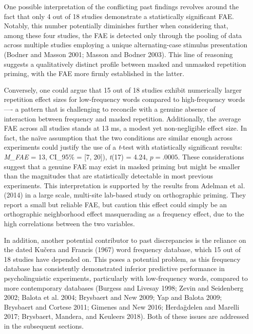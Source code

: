 \documentclass[
]{interact}
\begin{document}
One possible interpretation of the conflicting past findings revolves
around the fact that only 4 out of 18 studies demonstrate a
statistically significant FAE. Notably, this number potentially
diminishes further when considering that, among these four studies, the
FAE is detected only through the pooling of data across multiple studies
employing a unique alternating-case stimulus presentation (Bodner and
Masson 2001; Masson and Bodner 2003). This line of reasoning suggests a
qualitatively distinct profile between masked and unmasked repetition
priming, with the FAE more firmly established in the latter.

Conversely, one could argue that 15 out of 18 studies exhibit
numerically larger repetition effect sizes for low-frequency words
compared to high-frequency words ---- a pattern that is challenging to
reconcile with a genuine absence of interaction between frequency and
masked repetition. Additionally, the average FAE across all studies
stands at 13 ms, a modest yet non-negligible effect size. In fact, the
naïve assumption that the two conditions are similar enough across
experiments could justify the use of a \emph{t}-test with statistically
significant results: \emph{M\_FAE} = 13, CI\_95\% = {[}7, 20{]}),
\emph{t}(17) = 4.24, \(p=.0005\). These considerations suggest that a
genuine FAE may exist in masked priming but might be smaller than the
magnitudes that are statistically detectable in most previous
experiments. This interpretation is supported by the results from
Adelman et al. (2014) in a large scale, multi-site lab-based study on
orthographic priming. They report a small but reliable FAE, but caution
this effect could simply be an orthographic neighborhood effect
masquerading as a frequency effect, due to the high correlations between
the two variables.

In addition, another potential contributor to past discrepancies is the
reliance on the dated Kučera and Francis (1967) word frequency database,
which 15 out of 18 studies have depended on. This poses a potential
problem, as this frequency database has consistently demonstrated
inferior predictive performance in psycholinguistic experiments,
particularly with low-frequency words, compared to more contemporary
databases (Burgess and Livesay 1998; Zevin and Seidenberg 2002; Balota
et al. 2004; Brysbaert and New 2009; Yap and Balota 2009; Brysbaert and
Cortese 2011; Gimenes and New 2016; Herdağdelen and Marelli 2017;
Brysbaert, Mandera, and Keuleers 2018). Both of these issues are
addressed in the subsequent sections.
\end{document}

